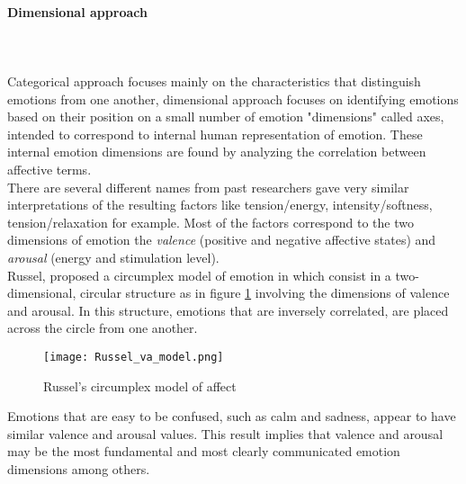 \paragraph{Dimensional approach}
\mbox{} \\ \\ \indent
Categorical approach focuses mainly on the characteristics that distinguish emotions from one another, dimensional approach focuses on identifying emotions based on their position on a small number of emotion "dimensions" called axes, intended to correspond to internal human representation of emotion. These internal emotion dimensions are found by analyzing the correlation between affective terms.
\\ \indent
There are several different names from past researchers gave very similar interpretations of the resulting factors like tension/energy, intensity/softness, tension/relaxation for example. Most of the factors correspond to the two dimensions of emotion the \textit{valence} (positive and negative affective states) and \textit{arousal} (energy and stimulation level).
\\
Russel, proposed a circumplex model of emotion in \cite{russell1980circumplex} which consist in a two-dimensional, circular structure as in figure \ref{fig:Russel_va_model} involving the dimensions of valence and arousal. In this structure, emotions that are inversely correlated, are placed across the circle from one another.
\begin{figure}[h]
    \centering
    \texttt{[image: Russel\_va\_model.png]} 
	\caption{Russel's circumplex model of affect}
    \label{fig:Russel_va_model}
\end{figure}

Emotions that are easy to be confused, such as calm and sadness, appear to have similar valence and arousal values. This result implies that valence and arousal may be the most fundamental and most clearly communicated emotion dimensions among others.














